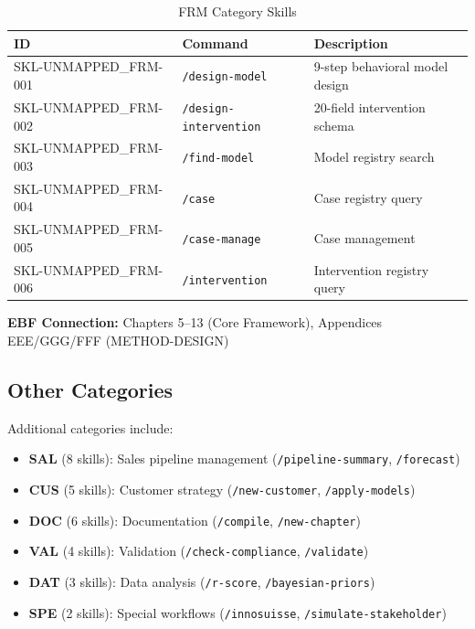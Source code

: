 \begin{table}[h]
\centering
\begin{tabular}{|l|l|l|}
\hline
\textbf{ID} & \textbf{Command} & \textbf{Description} \\
\hline
SKL-UNMAPPED_FRM-001 & \texttt{/design-model} & 9-step behavioral model design \\
SKL-UNMAPPED_FRM-002 & \texttt{/design-intervention} & 20-field intervention schema \\
SKL-UNMAPPED_FRM-003 & \texttt{/find-model} & Model registry search \\
SKL-UNMAPPED_FRM-004 & \texttt{/case} & Case registry query \\
SKL-UNMAPPED_FRM-005 & \texttt{/case-manage} & Case management \\
SKL-UNMAPPED_FRM-006 & \texttt{/intervention} & Intervention registry query \\
\hline
\end{tabular}
\caption{FRM Category Skills}
\end{table}

\textbf{EBF Connection:} Chapters 5--13 (Core Framework), Appendices EEE/GGG/FFF (METHOD-DESIGN)

\subsection{Other Categories}

Additional categories include:
\begin{itemize}
\item \textbf{SAL} (8 skills): Sales pipeline management (\texttt{/pipeline-summary}, \texttt{/forecast})
\item \textbf{CUS} (5 skills): Customer strategy (\texttt{/new-customer}, \texttt{/apply-models})
\item \textbf{DOC} (6 skills): Documentation (\texttt{/compile}, \texttt{/new-chapter})
\item \textbf{VAL} (4 skills): Validation (\texttt{/check-compliance}, \texttt{/validate})
\item \textbf{DAT} (3 skills): Data analysis (\texttt{/r-score}, \texttt{/bayesian-priors})
\item \textbf{SPE} (2 skills): Special workflows (\texttt{/innosuisse}, \texttt{/simulate-stakeholder})
\end{itemize}


